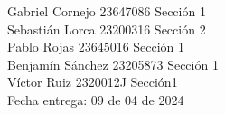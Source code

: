 \documentclass[letterpaper]{article}
\begin{document}
	\vspace*{30mm}
	\flushright 
	
	Gabriel Cornejo 23647086 Sección 1\\
	Sebastián Lorca 23200316 Sección 2\\
	Pablo Rojas	23645016 Sección 1\\
	Benjamín Sánchez  23205873 Sección 1\\
	Víctor Ruiz 2320012J Sección1\\
	
	
	\vspace*{5mm}
	{\large Fecha entrega: 09 de 04 de 2024\\}
	
	\newpage
	\begin{flushleft}
		\tableofcontents
	\end{flushleft}
	
\end{document}
